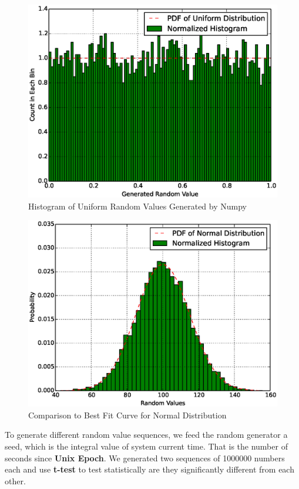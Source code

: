 \documentclass[12pt]{article}  %
\theoremstyle{definition}
\theoremstyle{remark}
\begin{document}
\begin{figure}
\centering
        \includegraphics[scale=0.6]{rg_histogram.eps}
        \caption{Histogram of Uniform Random Values Generated by Numpy}
        \label{fig:uniform}
\end{figure}
\begin{figure}
        \centering
        \includegraphics[scale=0.6]{rg_fitness.eps}
        \caption{Comparison to Best Fit Curve for Normal Distribution}
        \label{fig:normal}
\end{figure}

To generate different random value sequences, we feed the random generator a seed, which is the integral value of system current time.
That is the number of seconds since \textbf{Unix Epoch}.
We generated two sequences of 1000000 numbers each and use \textbf{t-test} to test statistically are they significantly different from each other.
\end{document}
